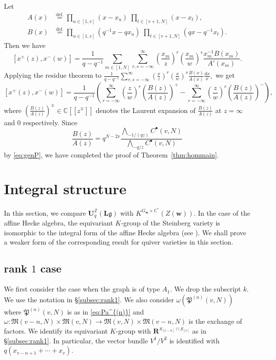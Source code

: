 \documentclass[12pt]{amsart}
\def\Bbb{\mathbb}
\def\frak{\mathfrak}
\theoremstyle{definition}
\theoremstyle{remark}
\numberwithin{equation}{subsection}
\newcommand{\thmref}[1]{Theorem~\ref{#1}}
\newcommand{\subsecref}[1]{\S\ref{#1}}
\newcommand{\defeq}{\overset{\operatorname{\scriptstyle def.}}{=}}
\newcommand{\C}{{\Bbb C}}
\newcommand{\Z}{{\Bbb Z}}
\newcommand{\M}{{\frak M}} %
\newcommand{\bw}{{\mathbf w}} %
\newcommand{\Uli}{{\mathbf U}^{\Z}_q({\mathbf L}\mathfrak g)}
\newcommand{\Pa}{{\frak P}} %
\newcommand{\Wedge}{{\textstyle \bigwedge}}
\newcommand{\Zw}{Z(\bw)}
\begin{document}
Let
\begin{equation*}
\begin{split}
  A(x) & \defeq \prod_{u\in [1,v]} (x - x_u)\;
                \prod_{t\in [v+1,N]} (x - x_t), \\
  B(x) & \defeq \prod_{u\in [1,v]} (q^{-1} x - q x_u)\;
                \prod_{t\in [v+1,N]} (q x - q^{-1} x_t).
\end{split}
\end{equation*}
Then we have
\begin{equation*}
  \left[ x^+(z), x^-(w)\right]
  = \frac{1}{q - q^{-1}}\sum_{m\in [1,N]}
    \sum_{r,s=-\infty}^\infty \left(\frac{x_m}{z}\right)^r
                               \left(\frac{x_m}{w}\right)^s
    \frac{x_m^{-1}B(x_m)}{A'(x_m)}.
\end{equation*}
Applying the residue theorem to
\(
   \frac{1}{q - q^{-1}}  
   \sum_{r,s=-\infty}^\infty \left(\frac{x}{z}\right)^r
                             \left(\frac{x}{w}\right)^s
   \frac{B(x)}{A(x)} \frac{dx}{x},
\)
we get
\begin{equation*}
    \left[ x^+(z), x^-(w)\right]
  = \frac{1}{q - q^{-1}}\left(
    \sum_{r=-\infty}^\infty \left(\frac{z}{w}\right)^r
    \left(\frac{B(z)}{A(z)}\right)^+
    - \sum_{r=-\infty}^\infty \left(\frac{z}{w}\right)^r
    \left(\frac{B(z)}{A(z)}\right)^-\right),
\end{equation*}
where
\(
\left(\frac{B(z)}{A(z)}\right)^\pm \in \C[[z^{\mp}]]
\)
denotes the Laurent expansion of $\frac{B(z)}{A(z)}$ at $z = \infty$ and
$0$ respectively. Since
\begin{equation*}
  \frac{B(z)}{A(z)} = q^{N-2v}
  \frac{\Wedge_{-1/(qz)}C^\bullet(v,N)}{\Wedge_{-q/z}C^\bullet(v,N)}
\end{equation*}
by \eqref{eq:genP}, we have completed the proof of \thmref{thm:hommain}.

\section{Integral structure}\label{sec:int}
In this section, we compare $\Uli$ with $K^{G_\bw\times\C^*}(\Zw)$. In 
the case of the affine Hecke algebra, the equivariant $K$-group of the 
Steinberg variety is isomorphic to the integral form of the affine
Hecke algebra (see \cite[7.2.5]{Gi-book}).
%
We shall prove a weaker form of the corresponding result for quiver
varieties in this section.

\subsection{rank $1$ case}
We first consider the case when the graph is of type $A_1$. We drop
the subscript $k$. We use the notation in \subsecref{subsec:rank1}.
We also consider $\omega(\Pa^{(n)}(v,N))$ where
$\Pa^{(n)}(v,N)$ is as in \eqref{eq:Pa^{(n)}} and
$\omega\colon \M(v-n,N)\times \M(v,N)\to \M(v,N)\times\M(v-n,N)$ is
the exchange of factors. We identify its equivariant $K$-group with
$\mathbf R^{S_{[v-n]}\cap S_{[v]}}$ as in \subsecref{subsec:rank1}.
In particular, the vector bundle $V^1/V^2$ is identified with
$q(x_{v-n+1}+\cdots+x_v)$.
\end{document}
